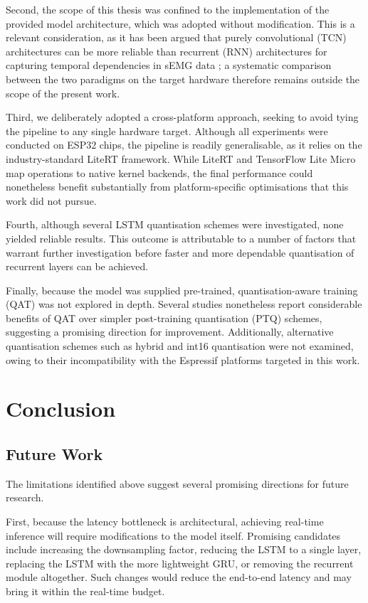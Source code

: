 \documentclass[12pt,DIV16,BCOR12mm,a4paper,footinclude=false,headinclude,parskip=half-,twoside,openright,cleardoublepage=empty,toc=index,bibliography=totoc,listof=totoc]{scrreprt}
\numberwithin{equation}{chapter}
\begin{document}
  Second, the scope of this thesis was confined to the implementation of the
  provided model architecture, which was adopted without modification. This is a
  relevant consideration, as it has been argued that purely convolutional (TCN)
  architectures can be more reliable than recurrent (RNN) architectures for
  capturing temporal dependencies in sEMG data \cite{zanghieriRobustRealTimeEmbedded2020};
  a systematic comparison between the two paradigms on the target hardware therefore
  remains outside the scope of the present work.

  Third, we deliberately adopted a cross-platform approach, seeking to avoid
  tying the pipeline to any single hardware target. Although all experiments were
  conducted on ESP32 chips, the pipeline is readily generalisable, as it relies on
  the industry-standard LiteRT framework. While LiteRT and TensorFlow Lite Micro
  map operations to native kernel backends, the final performance could nonetheless
  benefit substantially from platform-specific optimisations that this work did not pursue.

  Fourth, although several LSTM quantisation schemes were investigated, none yielded
  reliable results. This outcome is attributable to a number of factors that warrant
  further investigation before faster and more dependable quantisation of recurrent
  layers can be achieved.

  Finally, because the model was supplied pre-trained, quantisation-aware training (QAT)
  was not explored in depth. Several studies nonetheless report considerable benefits of
  QAT over simpler post-training quantisation (PTQ) schemes, suggesting a promising
  direction for improvement. Additionally, alternative quantisation schemes such as hybrid
  and int16 quantisation were not examined, owing to their incompatibility with the
  Espressif platforms targeted in this work.

\chapter{Conclusion}

  \section{Future Work}
    The limitations identified above suggest several promising directions for future research.

    First, because the latency bottleneck is architectural, achieving real-time inference will
    require modifications to the model itself. Promising candidates include increasing the
    downsampling factor, reducing the LSTM to a single layer, replacing the LSTM with the more
    lightweight GRU, or removing the recurrent module altogether. Such changes would reduce the
    end-to-end latency and may bring it within the real-time budget.
\end{document}
